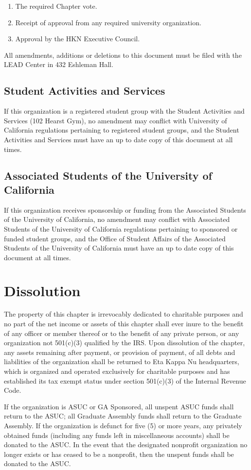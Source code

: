 \documentclass[11pt]{article}
\begin{document}
\begin{enumerate}
\item The required Chapter vote.
\item Receipt of approval from any required university organization.
\item Approval by the HKN Executive Council.
\end{enumerate}

All amendments, additions or deletions to this document must be filed with the LEAD Center in 432 Eshleman Hall.

\subsection{Student Activities and Services}
\label{sec:orge9cfad9}

If this organization is a registered student group with the Student Activities and Services (102 Hearst Gym), no amendment may conflict with University of California regulations pertaining to registered student groups, and the Student Activities and Services must have an up to date copy of this document at all times.

\subsection{Associated Students of the University of California}
\label{sec:org65ec629}

If this organization receives sponsorship or funding from the Associated Students of the University of California, no amendment may conflict with Associated Students of the University of California regulations pertaining to sponsored or funded student groups, and the Office of Student Affairs of the Associated Students of the University of California must have an up to date copy of this document at all times.
\section{Dissolution}
\label{sec:orgf3fc3e2}

The property of this chapter is irrevocably dedicated to charitable purposes and no part of the net income or assets of this chapter shall ever inure to the benefit of any officer or member thereof or to the benefit of any private person, or any organization not 501(c)(3) qualified by the IRS.
Upon dissolution of the chapter, any assets remaining after payment, or provision of payment, of all debts and liabilities of the organization shall be returned to Eta Kappa Nu headquarters, which is organized and operated exclusively for charitable purposes and has established its tax exempt status under section 501(c)(3) of the Internal Revenue Code.

If the organization is ASUC or GA Sponsored, all unspent ASUC funds shall return to the ASUC; all Graduate Assembly funds shall return to the Graduate Assembly.
If the organization is defunct for five (5) or more years, any privately obtained funds (including any funds left in miscellaneous accounts) shall be donated to the ASUC.
In the event that the designated nonprofit organization no longer exists or has ceased to be a nonprofit, then the unspent funds shall be donated to the ASUC.
\end{document}

